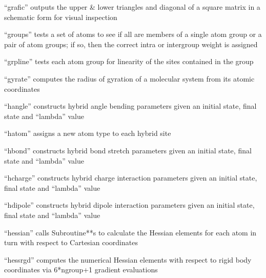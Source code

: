 \documentclass[letterpaper,11pt,english]{sphinxmanual}
\begin{document}

“grafic” outputs the upper \& lower triangles and diagonal of a square matrix in a schematic form for visual inspection


“groups” tests a set of atoms to see if all are members of a single atom group or a pair of atom groups; if so, then the correct intra\sphinxhyphen{} or intergroup weight is assigned


“grpline” tests each atom group for linearity of the sites contained in the group


“gyrate” computes the radius of gyration of a molecular system from its atomic coordinates


“hangle” constructs hybrid angle bending parameters given an initial state, final state and “lambda” value


“hatom” assigns a new atom type to each hybrid site


“hbond” constructs hybrid bond stretch parameters given an initial state, final state and “lambda” value


“hcharge” constructs hybrid charge interaction parameters given an initial state, final state and “lambda” value


“hdipole” constructs hybrid dipole interaction parameters given an initial state, final state and “lambda” value


“hessian” calls Subroutine**s to calculate the Hessian elements for each atom in turn with respect to Cartesian coordinates


“hessrgd” computes the numerical Hessian elements with respect to rigid body coordinates via 6*ngroup+1 gradient evaluations

\end{document}
